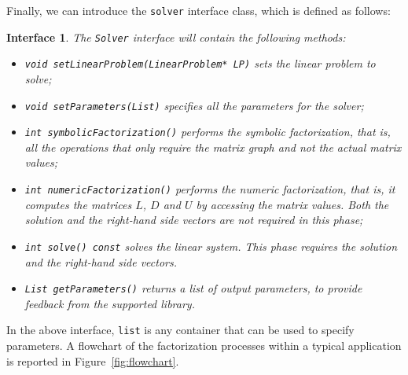 \documentclass[acmtoms,acmnow]{acmtrans2m}
\newtheorem{interface}{Interface}[section]
\begin{document}
Finally, we can introduce the {\tt solver} interface class, which is defined as
follows:
\begin{interface}
\label{int:asi}
The {\tt Solver} interface
will contain the following methods:
\begin{itemize}
\item \verb!void setLinearProblem(LinearProblem* LP)! sets the linear problem
to solve;
\item \verb!void setParameters(List)! specifies all the parameters for the solver;
\item \verb!int symbolicFactorization()! performs the symbolic factorization, that
is, all the operations that only require the matrix graph and not
the actual matrix values;
\item \verb!int numericFactorization()! performs the numeric factorization, that
is, it computes the matrices $L$, $D$ and $U$ by accessing the matrix values.
Both the solution and the right-hand side vectors are not required in this phase;
\item \verb!int solve() const! solves the linear system. This phase requires the
solution and the right-hand side vectors.
\item \verb!List getParameters()! returns a list of output parameters, to
provide feedback from the supported library.
\end{itemize}
\end{interface}
In the above interface, {\tt list} is any container that can be used
to specify parameters. A flowchart of the factorization processes
within a typical application is reported in
Figure~\ref{fig:flowchart}.
\end{document}
